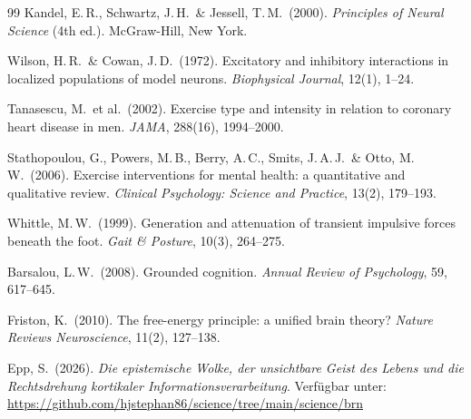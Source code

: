 ﻿\documentclass[12pt,a4paper]{report}
\theoremstyle{plain}
\theoremstyle{definition}
\theoremstyle{remark}
\begin{document}
\begin{thebibliography}{99}
Kandel, E.\,R., Schwartz, J.\,H.\ \& Jessell, T.\,M.\ (2000).
\textit{Principles of Neural Science} (4th ed.).
McGraw-Hill, New York.

Wilson, H.\,R.\ \& Cowan, J.\,D.\ (1972).
Excitatory and inhibitory interactions in localized populations of model neurons.
\textit{Biophysical Journal}, 12(1), 1--24.

Tanasescu, M.\ et al.\ (2002).
Exercise type and intensity in relation to coronary heart disease in men.
\textit{JAMA}, 288(16), 1994--2000.

Stathopoulou, G., Powers, M.\,B., Berry, A.\,C., Smits, J.\,A.\,J.\
\& Otto, M.\,W.\ (2006).
Exercise interventions for mental health: a quantitative and qualitative review.
\textit{Clinical Psychology: Science and Practice}, 13(2), 179--193.

Whittle, M.\,W.\ (1999).
Generation and attenuation of transient impulsive forces beneath the foot.
\textit{Gait \& Posture}, 10(3), 264--275.

Barsalou, L.\,W.\ (2008).
Grounded cognition.
\textit{Annual Review of Psychology}, 59, 617--645.

Friston, K.\ (2010).
The free-energy principle: a unified brain theory?
\textit{Nature Reviews Neuroscience}, 11(2), 127--138.

Epp, S.\ (2026).
\textit{Die epistemische Wolke, der unsichtbare Geist des Lebens
und die Rechtsdrehung kortikaler Informationsverarbeitung}.
Verfügbar unter: \url{https://github.com/hjstephan86/science/tree/main/science/brn}

\end{thebibliography}
\end{document}
